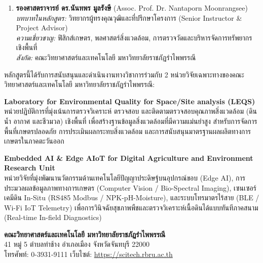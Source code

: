 \begin{enumerate}
    \item \textbf{รองศาสตราจารย์ ดร.นันทพร มูลรังษี} (Assoc. Prof. Dr. Nantaporn Moonrangsee)\\
    \textit{บทบาทในหลักสูตร:} วิทยากรผู้ทรงคุณวุฒิและที่ปรึกษาโครงการ (Senior Instructor \& Project Advisor)\\
    \textit{ความเชี่ยวชาญ:} ฟิสิกส์เกษตร, พลศาสตร์สิ่งแวดล้อม, การตรวจวัดและบริหารจัดการทรัพยากรเชิงพื้นที่\\
    \textit{สังกัด:} คณะวิทยาศาสตร์และเทคโนโลยี มหาวิทยาลัยราชภัฏรำไพพรรณี
\end{enumerate}

\label{sec:research_units}

หลักสูตรนี้ได้รับการสนับสนุนและดำเนินงานทางวิชาการร่วมกับ 2 หน่วยวิจัยเฉพาะทางของคณะวิทยาศาสตร์และเทคโนโลยี มหาวิทยาลัยราชภัฏรำไพพรรณี:

\begin{tcolorbox}[colback=teal!5!white,colframe=teal!65!black,title=\textbf{1. หน่วยวิเคราะห์คุณภาพสิ่งแวดล้อมสำหรับพื้นที่ (LEQS)},arc=2mm]
    \textbf{Laboratory for Environmental Quality for Space/Site analysis (LEQS)}\\
    หน่วยปฏิบัติการที่มุ่งเน้นการตรวจวิเคราะห์ ตรวจสอบ และติดตามตรวจสอบคุณภาพสิ่งแวดล้อม (ดิน น้ำ อากาศ และชีวมวล) เชิงพื้นที่ เพื่อสร้างฐานข้อมูลสิ่งแวดล้อมที่มีความแม่นยำสูง สำหรับการจัดการพื้นที่เกษตรปลอดภัย การประเมินผลกระทบสิ่งแวดล้อม และการสนับสนุนมาตรฐานผลผลิตทางการเกษตรในภาคตะวันออก
\end{tcolorbox}

\begin{tcolorbox}[colback=orange!5!white,colframe=orange!80!black,title=\textbf{2. หน่วยวิจัยปัญญาประดิษฐ์ฝังตัวและเอดจ์เอไอโอทีเพื่อเกษตรดิจิทัลและสิ่งแวดล้อม},arc=2mm]
    \textbf{Embedded AI \& Edge AIoT for Digital Agriculture and Environment Research Unit}\\
    หน่วยวิจัยที่มุ่งพัฒนานวัตกรรมด้านเทคโนโลยีปัญญาประดิษฐ์บนอุปกรณ์ขอบ (Edge AI), การประมวลผลข้อมูลภาพทางการเกษตร (Computer Vision / Bio-Spectral Imaging), เซนเซอร์เคมีดิน In-Situ (RS485 Modbus / NPK-pH-Moisture), และระบบโทรมาตรไร้สาย (BLE / Wi-Fi IoT Telemetry) เพื่อการวินิจฉัยสุขภาพพืชและตรวจวิเคราะห์เนื้อดินได้แบบทันทีภาคสนาม (Real-time In-field Diagnostics)
\end{tcolorbox}

\begin{center}
    \vspace{6pt}
    {\fontsize{9.5}{13}\selectfont\color{gray!70!black}
    \textbf{คณะวิทยาศาสตร์และเทคโนโลยี มหาวิทยาลัยราชภัฏรำไพพรรณี}\\
    41 หมู่ 5 ตำบลท่าช้าง อำเภอเมือง จังหวัดจันทบุรี 22000\\
    โทรศัพท์: 0-3931-9111 \enspace\textbullet\enspace เว็บไซต์: \url{https://scitech.rbru.ac.th}}
\end{center}
